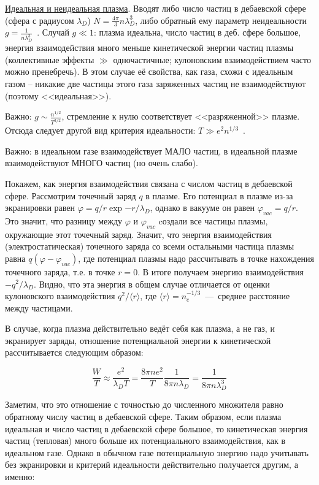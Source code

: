 \documentclass[10pt, a4paper]{article}
\begin{document}
\uline{Идеальная и неидеальная плазма}. Вводят либо число частиц в дебаевской сфере (сфера с радиусом $\lambda_D$) $N = \frac{4\pi}{3}n\lambda_D^3$, либо обратный ему параметр неидеальности $g = \frac{1}{n\lambda_D^3}$~\cite{kroll}. Случай $g \ll 1$: плазма идеальна, число частиц в деб. сфере большое, энергия взаимодействия много меньше кинетической энергии частиц плазмы (коллективные эффекты $\gg$ одночастичные; кулоновским взаимодействием часто можно пренебречь). В этом случае её свойства, как газа, схожи с идеальным газом -- никакие две частицы этого газа заряженных частиц не взаимодействуют (поэтому <<идеальная>>).

Важно: $g \sim \frac{n^{1/2}}{T^{3/2}}$, стремление к нулю соответствует <<разряженной>> плазме. Отсюда следует другой вид критерия идеальности: $T \gg e^2 n^{1/3}$~\cite{kotelnikov}.

Важно: в идеальном газе взаимодействует МАЛО частиц, в идеальной плазме взаимодействуют МНОГО частиц (но очень слабо).

Покажем, как энергия взаимодействия связана с числом частиц в дебаевской сфере. Рассмотрим точечный заряд $q$ в плазме. Его потенциал в плазме из-за экранировки равен $\varphi = q/r\exp{-r/\lambda_D}$, однако в вакууме он равен $\varphi_{vac}=q/r$. Это значит, что разницу между $\varphi$ и $\varphi_{vac}$ cоздали все частицы плазмы, окружающие этот точечный заряд.
Значит, что энергия взаимодействия (электростатическая) точечного заряда со всеми остальными частица плазмы равна $q (\varphi - \varphi_{vac})$, где потенциал плазмы надо рассчитывать в точке нахождения точечного заряда, т.е. в точке $r=0$. В итоге получаем энергию взаимодействия $-q^2/\lambda_D$.
Видно, что эта энергия в общем случае отличается от оценки кулоновского взаимодействия $q^2/\langle r\rangle$, где $\langle r \rangle = n_e^{-1/3}$~---~среднее расстояние между частицами.

В случае, когда плазма действительно ведёт себя как плазма, а не газ, и экранирует заряды, отношение потенциальной энергии к кинетической рассчитывается следующим образом:

\begin{equation}
	\frac{W}{T} \approx \frac{e^2}{\lambda_D T} = \frac{8\pi n e^2}{T}\frac{1}{8\pi n\lambda_D} = \frac{1}{8\pi n \lambda_D^3}
\end{equation}

Заметим, что это отношение с точностью до численного множителя равно обратному числу частиц в дебаевской сфере. Таким образом, если плазма идеальная и число частиц в дебаевской сфере большое, то кинетическая энергия частиц (тепловая) много больше их потенциального взаимодействия, как в идеальном газе. Однако в обычном газе потенциальную энергию надо учитывать без экранировки и критерий идеальности действительно получается другим, а именно:
\end{document}
